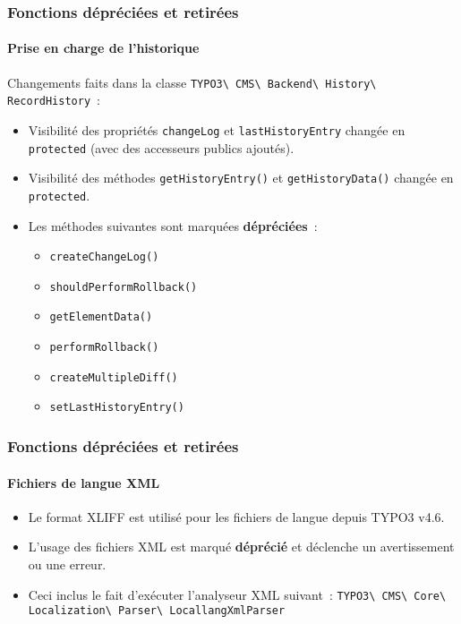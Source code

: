 
\begin{frame}[fragile]
	\frametitle{Fonctions dépréciées et retirées}
	\framesubtitle{Prise en charge de l'historique}

	Changements faits dans la classe
		\smaller
			\texttt{TYPO3\textbackslash
				CMS\textbackslash
				Backend\textbackslash
				History\textbackslash
				RecordHistory}~:
		\normalsize

	\begin{itemize}

		\item Visibilité des propriétés \texttt{changeLog} et \texttt{lastHistoryEntry}
			changée en \texttt{protected} (avec des accesseurs publics ajoutés).
		\item Visibilité des méthodes \texttt{getHistoryEntry()} et \texttt{getHistoryData()}
			changée en \texttt{protected}.
		\item Les méthodes suivantes sont marquées \textbf{dépréciées}~:

			\begin{itemize}\smaller
				\item \texttt{createChangeLog()}
				\item \texttt{shouldPerformRollback()}
				\item \texttt{getElementData()}
				\item \texttt{performRollback()}
				\item \texttt{createMultipleDiff()}
				\item \texttt{setLastHistoryEntry()}
			\end{itemize}\normalsize

	\end{itemize}

\end{frame}


\begin{frame}[fragile]
	\frametitle{Fonctions dépréciées et retirées}
	\framesubtitle{Fichiers de langue XML}

	\begin{itemize}
		\item Le format XLIFF est utilisé pour les fichiers de langue depuis TYPO3 v4.6.
		\item L'usage des fichiers XML est marqué \textbf{déprécié}
			et déclenche un avertissement ou une erreur.
		\item Ceci inclus le fait d'exécuter l'analyseur XML suivant~:\newline
			\small
				\texttt{TYPO3\textbackslash
					CMS\textbackslash
					Core\textbackslash
					Localization\textbackslash
					Parser\textbackslash
					LocallangXmlParser}
			\normalsize
	\end{itemize}

\end{frame}

